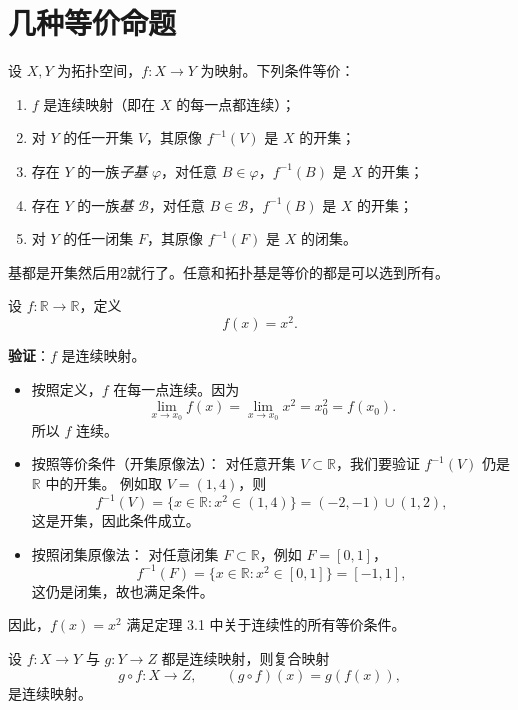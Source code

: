 \section{几种等价命题}
\begin{theorem}[连续性的等价刻画]\label{thm:cont-equiv}
设 \(X,Y\) 为拓扑空间，\(f:X\to Y\) 为映射。下列条件等价：
\begin{enumerate}
  \item \(f\) 是连续映射（即在 \(X\) 的每一点都连续）；
  \item 对 \(Y\) 的任一开集 \(V\)，其原像 \(f^{-1}(V)\) 是 \(X\) 的开集；
  \item 存在 \(Y\) 的一族\emph{子基} \(\varphi\)，对任意 \(B\in\varphi\)，\(f^{-1}(B)\) 是 \(X\) 的开集；
  \item 存在 \(Y\) 的一族\emph{基} \(\mathcal{B}\)，对任意 \(B\in\mathcal{B}\)，\(f^{-1}(B)\) 是 \(X\) 的开集；
  \item 对 \(Y\) 的任一闭集 \(F\)，其原像 \(f^{-1}(F)\) 是 \(X\) 的闭集。
\end{enumerate}
\end{theorem}
\begin{note}
    基都是开集然后用2就行了。任意和拓扑基是等价的都是可以选到所有。
\end{note}
\begin{example}[连续性的等价刻画的具体例子]
设 $f:\mathbb{R}\to\mathbb{R}$，定义
\[
f(x)=x^2.
\]

\textbf{验证}：$f$ 是连续映射。

\begin{itemize}
  \item[(1)] 按照定义，$f$ 在每一点连续。因为
  \[
  \lim_{x\to x_0} f(x)=\lim_{x\to x_0} x^2 = x_0^2 = f(x_0).
  \]
  所以 $f$ 连续。

  \item[(2)] 按照等价条件（开集原像法）：  
  对任意开集 $V\subset\mathbb{R}$，我们要验证 $f^{-1}(V)$ 仍是 $\mathbb{R}$ 中的开集。  
  例如取 $V=(1,4)$，则
  \[
  f^{-1}(V)=\{x\in\mathbb{R}:x^2\in(1,4)\}=(-2,-1)\cup(1,2),
  \]
  这是开集，因此条件成立。

  \item[(3)] 按照闭集原像法：  
  对任意闭集 $F\subset\mathbb{R}$，例如 $F=[0,1]$，  
  \[
  f^{-1}(F)=\{x\in\mathbb{R}:x^2\in[0,1]\}=[-1,1],
  \]
  这仍是闭集，故也满足条件。
\end{itemize}

因此，$f(x)=x^2$ 满足定理 3.1 中关于连续性的所有等价条件。
\end{example}
\begin{corollary}[复合连续映射仍连续]
设 \(f:X\to Y\) 与 \(g:Y\to Z\) 都是连续映射，则复合映射
\[
g\circ f: X\to Z,\qquad (g\circ f)(x)=g(f(x)),
\]
是连续映射。
\end{corollary}
